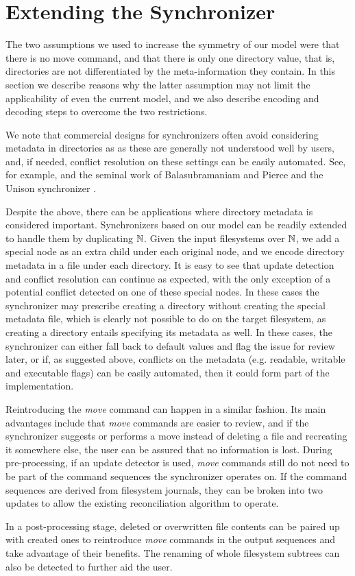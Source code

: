 
\section{Extending the Synchronizer}

The two assumptions we used to increase the symmetry of our model were
that there is no move command,
and that
there is only one directory value, that is, directories are not differentiated
by the meta-information they contain.
In this section we describe reasons why the latter assumption may not limit the applicability
of even the current model, and we also describe encoding and decoding steps
to overcome the two restrictions.

We note that commercial designs for synchronizers 
often avoid considering metadata in directories as
as these are generally not understood well by users,
and, if needed, conflict resolution on these settings can be easily automated.
See, for example, \cite{BZ} and the seminal work of Balasubramaniam and Pierce and the Unison synchronizer \cite{BP}.

Despite the above, there can be applications where directory metadata
is considered important.
Synchronizers based on our model can be readily extended to handle them
by duplicating $\mathbb{N}$. 
Given the input filesystems over $\mathbb{N}$, we add a special node as an extra child under each original node,
and we encode directory metadata in a file under each directory.
It is easy to see that update detection and conflict resolution can continue as expected,
with the only exception of a potential conflict detected on one of these special nodes.
In these cases the synchronizer may prescribe creating a directory without creating
the special metadata file, which is clearly not possible to do on the target filesystem,
as creating a directory entails specifying its metadata as well.
In these cases, the synchronizer can either fall back to default values and flag the issue
for review later, or if, as suggested above, conflicts on the metadata (e.g. readable, writable and executable flags)
can be easily automated, then it could form part of the implementation.

Reintroducing the \emph{move} command can happen in a similar fashion.
Its main advantages include that 
\emph{move} commands are easier to review,
and if the synchronizer suggests or performs a move instead
of deleting a file and recreating it somewhere else, the user
can be assured that no information is lost.
During pre-processing, if an update detector is used,
\emph{move} commands still do not need to be part of the command sequences
the synchronizer operates on.
If the command sequences are derived from filesystem journals, they
can be broken into two updates to allow the existing reconciliation
algorithm to operate.

In a post-processing stage, deleted or overwritten file contents
can be paired up with created ones to reintroduce \emph{move}
commands in the output sequences and take advantage of their benefits.
The renaming of whole filesystem subtrees can also be detected
to further aid the user.

